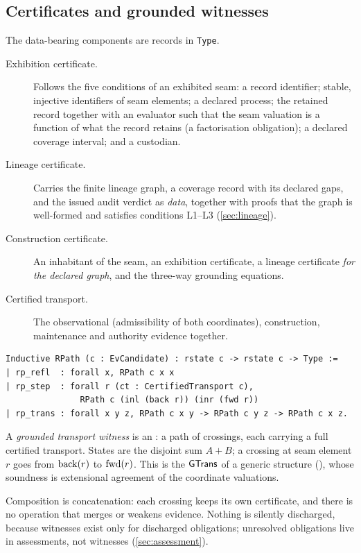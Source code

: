 \subsection{Certificates and grounded witnesses}
The data-bearing components are records in \texttt{Type}.
\begin{description}
\item[Exhibition certificate.] Follows the five conditions of an exhibited seam: a record identifier; stable, injective identifiers of seam elements; a declared process; the retained record together with an evaluator such that the seam valuation is a function of what the record retains (a factorisation obligation); a declared coverage interval; and a custodian.
\item[Lineage certificate.] Carries the finite lineage graph, a coverage record with its declared gaps, and the issued audit verdict as \emph{data}, together with proofs that the graph is well-formed and satisfies conditions L1--L3 (\cref{sec:lineage}).
\item[Construction certificate.] An inhabitant of the seam, an exhibition certificate, a lineage certificate \emph{for the declared graph}, and the three-way grounding equations.
\item[Certified transport.] The observational (admissibility of both coordinates), construction, maintenance and authority evidence together.
\end{description}
\begin{lstlisting}
Inductive RPath (c : EvCandidate) : rstate c -> rstate c -> Type :=
| rp_refl  : forall x, RPath c x x
| rp_step  : forall r (ct : CertifiedTransport c),
               RPath c (inl (back r)) (inr (fwd r))
| rp_trans : forall x y z, RPath c x y -> RPath c y z -> RPath c x z.
\end{lstlisting}
A \emph{grounded transport witness} is an : a path of crossings, each carrying a full certified transport. States are the disjoint sum $A + B$; a crossing at seam element $r$ goes from $\mathrm{back}(r)$ to $\mathrm{fwd}(r)$. This is the $\mathsf{GTrans}$ of a generic structure (), whose soundness is extensional agreement of the coordinate valuations.

Composition is concatenation: each crossing keeps its own certificate, and there is no operation that merges or weakens evidence. Nothing is silently discharged, because witnesses exist only for discharged obligations; unresolved obligations live in assessments, not witnesses (\cref{sec:assessment}).


